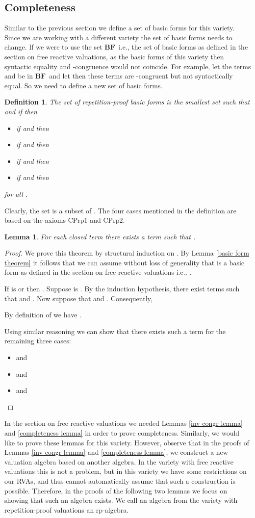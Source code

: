 \documentclass[a4paper,twoside,openright]{report}
\newcommand{\BF}{\ensuremath{\textbf{BF}}}
\newcommand{\CPrp}[1]{\ensuremath{\mathrm{CPrp#1}}}
\newtheorem{lem}[theorem]{Lemma}
\newtheorem{defn}[theorem]{Definition}
\begin{document}
\subsection{Completeness}
Similar to the previous section we define a set of basic forms for this variety. Since we are working with a different variety the set of basic forms needs to change. If we were to use the set \BF\ i.e., the set of basic forms as defined in the section on free reactive valuations, as the basic forms of this variety then syntactic equality and -congruence would not coincide. For example, let the terms  and  be in \BF\ and let  then these terms are -congruent but not syntactically equal. So we need to define a new set of basic forms.
\begin{defn}
The set of repetition-proof basic forms is the smallest set  such that  and if  then
\begin{itemize}
\item if  and  then 
\item if  and  then 
\item if  and  then 
\item if  and  then 
\end{itemize}
for all .
\end{defn}
Clearly, the set  is a subset of . The four cases mentioned in the definition are based on the axioms \CPrp1 and \CPrp2. 
\begin{lem}
For each closed term  there exists a term  such
that .
\end{lem}
\begin{proof}
We prove this theorem by structural induction on . By Lemma \ref{basic form theorem} it follows that we can assume without loss of generality that  is a basic form as defined in the section on free reactive valuations i.e., .

If  is  or  then . Suppose  is . By the induction hypothesis,
there exist terms  such that 
and . Now suppose that  and . Consequently,

By definition of  we have .

Using similar reasoning we can show that there exists such a term
 for the remaining three cases:
\begin{itemize}
\item  and 
\item  and 
\item  and 
\end{itemize}
\end{proof}

In the section on free reactive valuations we needed Lemmas \ref{inv congr lemma} and \ref{completeness lemma} in order to prove completeness. Similarly, we would like to prove these lemmas for this variety. However, observe that in the proofs of Lemmas \ref{inv congr lemma} and \ref{completeness lemma}, we construct a new valuation algebra based on another algebra. In the variety with free reactive valuations this is not a problem, but in this variety we have some restrictions on our RVAs, and thus cannot automatically assume that such a construction is possible. Therefore, in the proofs of the following two lemmas we focus on showing that such an algebra exists. We call an algebra from the variety with repetition-proof valuations an rp-algebra.
\end{document}
